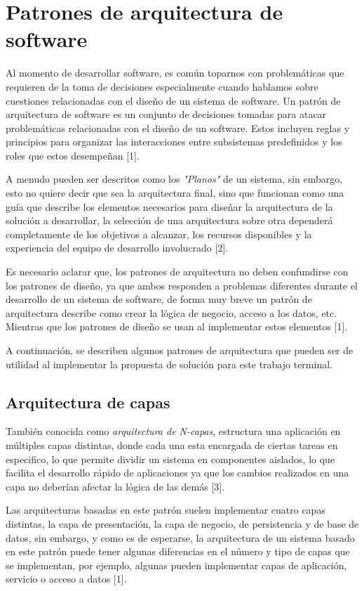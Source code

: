 
\section{Patrones de arquitectura de software}
Al momento de desarrollar software, es común toparnos con problemáticas que requieren de la toma de decisiones especialmente cuando hablamos sobre cuestiones relacionadas con el diseño de un sistema de software.
Un patrón de arquitectura de software es un conjunto de decisiones tomadas para atacar problemáticas relacionadas con el diseño de un software. Estos incluyen reglas y principios para organizar las interacciones entre subsistemas predefinidos y los roles que estos desempeñan [1].

A menudo pueden ser descritos como los \textit{"Planos"} de un sistema, sin embargo, esto no quiere decir que sea la arquitectura final, sino que funcionan como una guía que describe los elementos necesarios para diseñar la arquitectura de la solución a desarrollar, la selección de una arquitectura sobre otra dependerá completamente de los objetivos a alcanzar, los recursos disponibles y la experiencia del equipo de desarrollo involucrado [2].

Es necesario aclarar que, los patrones de arquitectura no deben confundirse con los patrones de diseño, ya que ambos responden a problemas diferentes durante el desarrollo de un sistema de software, de forma muy breve un patrón de arquitectura describe como crear la lógica de negocio, acceso a los datos, etc. Mientras que los patrones de diseño se usan al implementar estos elementos [1].

A continuación, se describen algunos patrones de arquitectura que pueden ser de utilidad al implementar la propuesta de solución para este trabajo terminal.	

\subsection{Arquitectura de capas}

También conocida como \textit{arquitectura de N-capas}, estructura una aplicación en múltiples capas distintas, donde cada una esta encargada de ciertas tareas en especifico, lo que permite dividir un sistema en componentes aislados, lo que facilita el desarrollo rápido de aplicaciones ya que los cambios realizados en una capa no deberían afectar la lógica de las demás [3].

Las arquitecturas basadas en este patrón suelen implementar cuatro capas distintas, la capa de presentación, la capa de negocio, de persistencia y de base de datos, sin embargo, y como es de esperarse, la arquitectura de un sistema basado en este patrón puede tener algunas diferencias en el número y tipo de capas que se implementan, por ejemplo, algunas pueden implementar capas de aplicación, servicio o acceso a datos [1].

